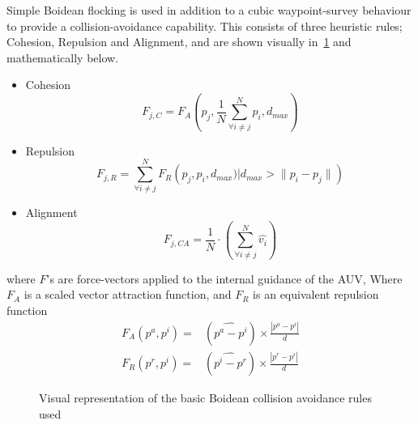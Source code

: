 \documentclass[conference]{IEEEtran}
\begin{document}
Simple Boidean flocking \cite{Reynolds1987a} is used in addition to a cubic waypoint-survey behaviour to provide a collision-avoidance capability.
This consists of three heuristic rules; Cohesion, Repulsion and Alignment, and are shown visually in~\ref{fig:boids} and mathematically below.
\begin{itemize}
  \item Cohesion
    \begin{equation}
      F_{j,C}= F_A\left(p_j, \frac{1}{N}\sum\limits_{\forall i \ne j}^N{p_i}, d_{max}\right)
    \end{equation}
  \item Repulsion
    \begin{equation}
      F_{j,R}= \sum\limits_{\forall i \ne j}^N F_R\left(p_j, p_i, d_{max}) \big| d_{max}>\|p_i-p_j\|\right)
    \end{equation}
  \item Alignment
    \begin{equation}
      F_{j,CA}= \frac{1}{N}\cdot\left(\sum\limits_{\forall i \ne j}^N \hat{v_i}\right) 
    \end{equation}
\end{itemize}
where $F$'s are force-vectors applied to the internal guidance of the AUV, 
Where $F_A$ is a scaled vector attraction function, and $F_R$ is an equivalent repulsion function
\begin{align}
  F_A(p^a, p^i)=&(\widehat{p^a-p^i}) \times \frac{|p^a-p^i|}{d}\\
  F_R(p^r, p^i)=&(\widehat{p^i-p^r}) \times \frac{|p^r-p^i|}{d}
\end{align}

\begin{figure}
  \centering
  \caption{Visual representation of the basic Boidean collision avoidance rules used}
  \label{fig:boids}
\end{figure}
\end{document}
